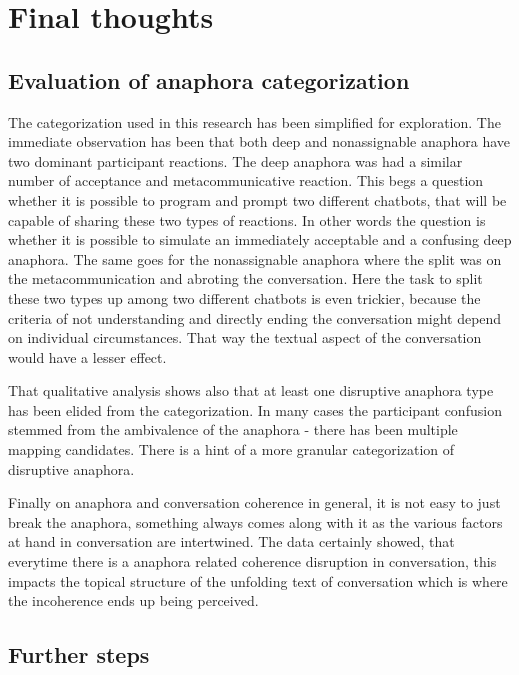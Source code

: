 \documentclass[12pt]{report}
\begin{document}
{

\chapter{Final thoughts}

\section{Evaluation of anaphora categorization}

    The categorization used in this research has been simplified for exploration.
    The immediate observation has been that both deep and nonassignable anaphora
    have two dominant participant reactions.
    The deep anaphora was had a similar number of acceptance and metacommunicative reaction.
    This begs a question whether it is possible to program and prompt two different chatbots,
    that will be capable of sharing these two types of reactions.
    In other words the question is whether it is possible to simulate an immediately acceptable
    and a confusing deep anaphora.
    The same goes for the nonassignable anaphora
    where the split was on the metacommunication and abroting the conversation.
    Here the task to split these two types up among two different chatbots is even trickier,
    because the criteria of not understanding and directly ending the conversation might depend on
    individual circumstances.
    That way the textual aspect of the conversation would have a lesser effect.

    That qualitative analysis shows also that
    at least one disruptive anaphora type has been elided from the categorization.
    In many cases the participant confusion stemmed from the ambivalence of the anaphora -
    there has been multiple mapping candidates.
    There is a hint of a more granular categorization of disruptive anaphora.

    Finally on anaphora and conversation coherence in general,
    it is not easy to just break the anaphora,
    something always comes along with it as the various factors at hand in conversation are intertwined.
    The data certainly showed, that everytime there is a anaphora related coherence disruption in conversation,
    this impacts the topical structure of the unfolding text of conversation
    which is where the incoherence ends up being perceived.

\section{Further steps}


}
\end{document}
